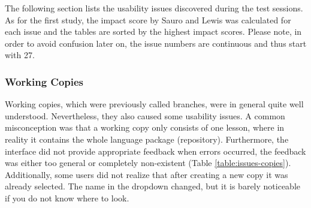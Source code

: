 The following section lists the usability issues discovered during the test sessions. As for the first study, the impact score by Sauro and Lewis \cite{sauro_quantifying_2012} was calculated for each issue and the tables are sorted by the highest impact scores. Please note, in order to avoid confusion later on, the issue numbers are continuous and thus start with 27.


\subsubsection{Working Copies}
Working copies, which were previously called branches, were in general quite well understood. Nevertheless, they also caused some usability issues. A common misconception was that a working copy only consists of one lesson, where in reality it contains the whole language package (repository).
Furthermore, the interface did not provide appropriate feedback when errors occurred, the feedback was either too general or completely non-existent (Table \ref{table:issues-copies}). Additionally, some users did not realize that after creating a new copy it was already selected. The name in the dropdown changed, but it is barely noticeable if you do not know where to look.


